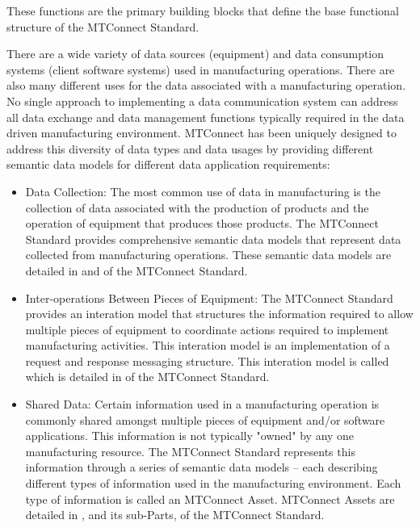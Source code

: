 These functions are the primary building blocks that define the base functional structure of the MTConnect Standard.

There are a wide variety of data sources (equipment) and data consumption systems (client software systems) used in manufacturing operations.  There are also many different uses for the data associated with a manufacturing operation.  No single approach to implementing a data communication system can address all data exchange and data management functions typically required in the data driven manufacturing environment.  MTConnect has been uniquely designed to address this diversity of data types and data usages by providing different \glspl{semantic data model} for different data application requirements:


\begin{itemize}
    \item Data Collection: The most common use of data in manufacturing is the collection of data associated with the production of products and the operation of equipment that produces those products.  The MTConnect Standard provides comprehensive \glspl{semantic data model} that represent data collected from manufacturing operations.  These \glspl{semantic data model} are detailed in  and  of the MTConnect Standard.

    \item Inter-operations Between Pieces of Equipment:  The MTConnect Standard provides an \gls{interation model} that structures the information required to allow multiple pieces of equipment to coordinate actions required to implement manufacturing activities.  This \gls{interation model} is an implementation of a \gls{request and response}  messaging structure.  This \gls{interation model} is called  which is detailed in  of the MTConnect Standard.

    \item Shared Data:  Certain information used in a manufacturing operation is commonly shared amongst multiple pieces of equipment and/or software applications.  This information is not typically "owned" by any one manufacturing resource.  The MTConnect Standard represents this information through a series of \glspl{semantic data model} – each describing different types of information used in the manufacturing environment.  Each type of information is called an \gls{MTConnect Asset}. \glspl{MTConnect Asset} are detailed in , and its sub-Parts, of the MTConnect Standard.

\end{itemize}

